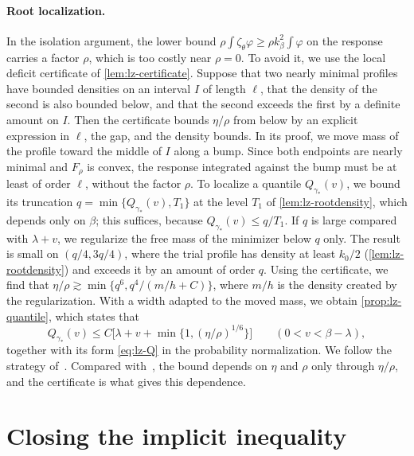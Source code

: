 \paragraph{Root localization.}
In the isolation argument, the lower bound
$\rho\int\zeta_\theta\varphi\ge\rho k_\beta^2\int\varphi$ on the response
carries a factor $\rho$, which is too costly near $\rho=0$. To avoid it,
we use the local deficit certificate of \cref{lem:lz-certificate}. Suppose that
two nearly minimal profiles have bounded densities on an interval $I$ of
length $\ell$, that the density of the second is also bounded below,
and that the second exceeds the first by a definite amount on $I$. Then
the certificate bounds $\eta/\rho$ from below by an explicit expression
in $\ell$, the gap, and the density bounds. In
its proof, we move mass of the profile toward the middle of $I$ along a
bump. Since both endpoints are nearly minimal and $F_\rho$ is convex,
the response integrated against the bump must be at least of order
$\ell$, without the factor $\rho$. To localize
a quantile $Q_{\gamma_*}(v)$, we bound its truncation
$q=\min\{Q_{\gamma_*}(v),T_1\}$ at the level $T_1$ of
\cref{lem:lz-rootdensity}, which depends only on $\beta$; this suffices,
because $Q_{\gamma_*}(v)\le q/T_1$. If $q$ is large compared with
$\lambda+v$, we regularize the free mass of the minimizer below $q$ only. The result
is small on $(q/4,3q/4)$, where the trial profile has density at least
$k_0/2$ (\cref{lem:lz-rootdensity}) and exceeds it by an amount of order
$q$. Using the certificate, we find that
$\eta/\rho\gtrsim\min\{q^6,q^4/(m/h+C)\}$, where $m/h$ is the density
created by the regularization. With a width adapted to the moved mass,
we obtain \cref{prop:lz-quantile},
which states that
\[
 Q_{\gamma_*}(v)\le C\bigl[\lambda+v+\min\{1,(\eta/\rho)^{1/6}\}\bigr]
 \qquad(0<v<\beta-\lambda),
\]
together with its form \eqref{eq:lz-Q} in the probability
normalization. We follow the strategy of~\cite[Lemma~7.6]{AL}. Compared
with~\cite[(7.30)]{AL}, the bound depends on $\eta$ and $\rho$ only
through $\eta/\rho$, and the certificate is what gives this dependence.

\section{Closing the implicit inequality}\label{sec:overview-closure}

